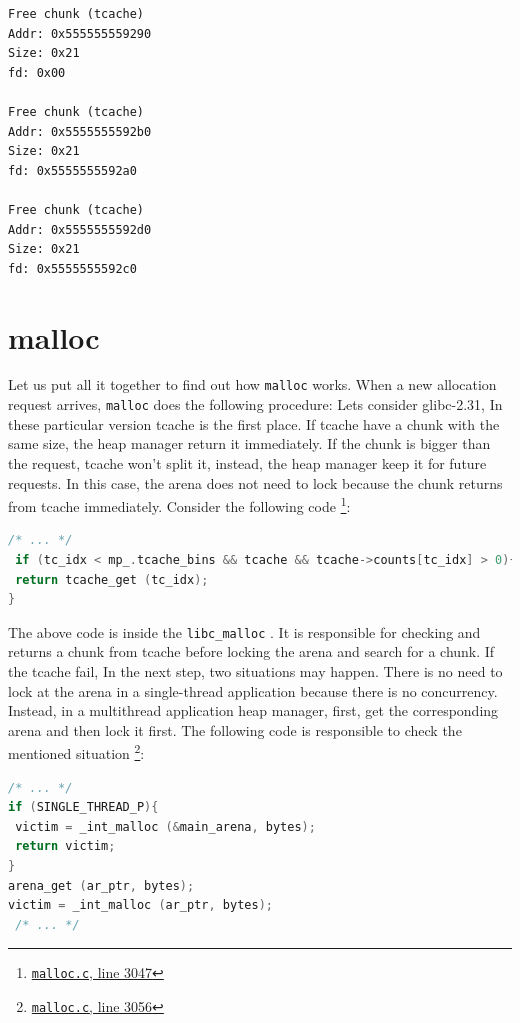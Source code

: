 \documentclass{masterthesis}
\newcommand*\libc{glibc}
\newcommand*\tch{tcache}
\newcommand*\mallocc{\lstinline{malloc}}
\begin{document}
\begin{lstlisting}[frame=tlrb]
Free chunk (tcache)
Addr: 0x555555559290
Size: 0x21
fd: 0x00

Free chunk (tcache)
Addr: 0x5555555592b0
Size: 0x21
fd: 0x5555555592a0

Free chunk (tcache)
Addr: 0x5555555592d0
Size: 0x21
fd: 0x5555555592c0
\end{lstlisting}

\section{malloc}
Let us put all it together to find out how \mallocc{} works. When a new allocation request arrives, \mallocc{} does the following procedure:
Lets consider \libc{-2.31}, In these particular version \tch{} is the first place. If \tch{} have a chunk with the same size, the heap manager return it immediately. If the chunk is bigger than the request, \tch{} won't split it, instead, the heap manager keep it for future requests. In this case, the arena does not need to lock because the chunk returns from \tch{} immediately. Consider the following code \footnote{\href{https://sourceware.org/git/?p=glibc.git;a=blob;f=malloc/malloc.c;h=f7cd29bc2f93e1082ee77800bd64a4b2a2897055;hb=9ea3686266dca3f004ba874745a4087a89682617\#l3047}{\texttt{malloc.c}, line 3047}}:

\begin{lstlisting}[language=c,frame=tlrb]
 /* ... */
 if (tc_idx < mp_.tcache_bins && tcache && tcache->counts[tc_idx] > 0){
 return tcache_get (tc_idx);
}
\end{lstlisting}

The above code is inside the \lstinline{libc_malloc} . It is responsible for checking and returns a chunk from \tch{} before locking the arena and search for a chunk. If the \tch{} fail, In the next step, two situations may happen. There is no need to lock at the arena in a single-thread application because there is no concurrency. Instead, in a multi\-thread application heap manager, first, get the corresponding arena and then lock it first. The following code is responsible to check the mentioned situation \footnote{\href{https://sourceware.org/git/?p=glibc.git;a=blob;f=malloc/malloc.c;h=f7cd29bc2f93e1082ee77800bd64a4b2a2897055;hb=9ea3686266dca3f004ba874745a4087a89682617\#l3056}{\texttt{malloc.c}, line 3056}}:

\begin{lstlisting}[language=c,frame=tlrb]
 /* ... */
if (SINGLE_THREAD_P){
 victim = _int_malloc (&main_arena, bytes);
 return victim;
}
arena_get (ar_ptr, bytes);
victim = _int_malloc (ar_ptr, bytes);
 /* ... */
\end{lstlisting}
\end{document}
